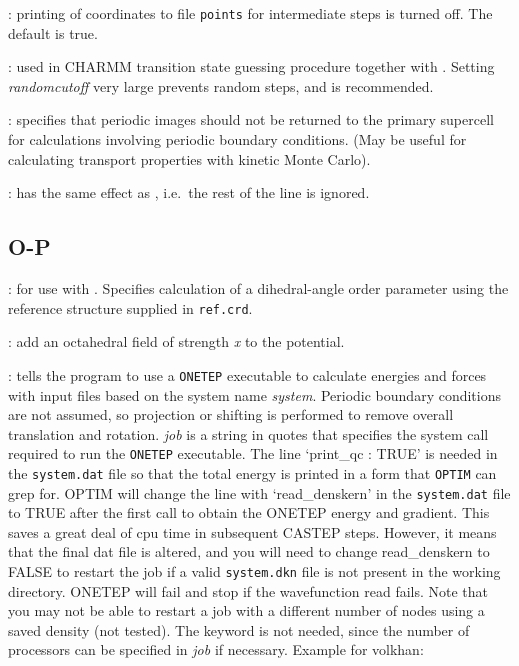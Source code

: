 {{{: printing of coordinates to file {\tt points} for intermediate steps
is turned off. The default is true.

: used in CHARMM transition state guessing procedure
together with {}. Setting {\it randomcutoff\/} very large prevents random
steps, and is recommended.

: specifies that periodic images should not be returned to the
primary supercell for calculations involving periodic boundary conditions. (May be
useful for calculating transport properties with kinetic Monte Carlo).

: has the same effect as , i.e.~the rest of the line
is ignored.

\subsection{O-P}
: for use with . Specifies calculation of
a dihedral-angle order parameter using the reference structure supplied in {\tt ref.crd}.

: add an octahedral field of strength {\it x} to the potential.

: tells the program to use a {\tt ONETEP} 
executable to calculate energies and
forces with input files based on the system name {\it system\/}. Periodic boundary 
conditions are not assumed, so projection or shifting is performed to remove overall translation and rotation.
{\it job} is a string in quotes that specifies the system call required to run 
the {\tt ONETEP} executable. 
The line `print\_qc : TRUE' is needed in the {\tt system.dat} file
so that the total energy is printed in a form that {\tt OPTIM} can grep for.
OPTIM will change the line with `read\_denskern' in the {\tt system.dat} file 
to TRUE after the first call to obtain the ONETEP energy and gradient.
This saves a great deal of cpu time in subsequent CASTEP steps.
However, it means that the final dat file is altered, and you will need
to change read\_denskern to FALSE to restart
the job if a valid {\tt system.dkn} file is not present in the working directory.
ONETEP will fail and stop if the wavefunction read fails.
Note that you may not be able to restart a job with a different number of nodes using
a saved density (not tested).
The {} keyword is not needed, since
the number of processors can be specified in {\it job} if necessary. Example for volkhan:

}}}

